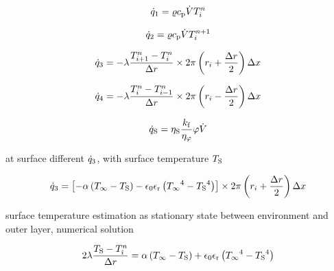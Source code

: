 \documentclass{scrartcl}
\begin{document}
    \begin{equation}
        {\dot{q}}_1 = {\varrho} {c_\mathrm{p}} {\dot{V}} {T}_{{i}}^{{n}}
        \label{eq:heat_flow_1}
    \end{equation}

    \begin{equation}
        {\dot{q}}_2 = {\varrho} {c_\mathrm{p}} {\dot{V}} {T}_{{i}}^{{n}+1}
        \label{eq:heat_flow_2}
    \end{equation}

    \begin{equation}
        {\dot{q}}_3 = -{\lambda} \frac{{T}_{{i}+1}^{{n}}-{T}_{{i}}^{{n}}}{{\Delta r}} \times 2 \pi \left( {r}_{i} + \frac{{\Delta r}}{2} \right) {\Delta x}
        \label{eq:heat_flow_3}
    \end{equation}

    \begin{equation}
        {\dot{q}}_4 = -{\lambda} \frac{{T}_{{i}}^{{n}}-{T}_{{i}-1}^{{n}}}{{\Delta r}} \times 2 \pi \left( {r}_{i} - \frac{{\Delta r}}{2} \right) {\Delta x}
        \label{eq:heat_flow_4}
    \end{equation}

    \begin{equation}
        {\dot{q}_\mathrm{S}} = {\eta_\mathrm{S}} \frac{{k_\mathrm{f}}}{{\eta_\varphi}} {\varphi} {\dot{V}}
        \label{eq:heat_source}
    \end{equation}

    at surface different ${\dot{q}}_3$, with surface temperature ${T_\mathrm{S}}$

    \begin{equation}
        {\dot{q}}_3 = \left[ -{\alpha} \left( {T_\infty} - {T_\mathrm{S}} \right) - {\epsilon_0}{\epsilon_\mathrm{r}}\left( {T_\infty}^4 - {T_\mathrm{S}}^4 \right) \right]
        \times 2 \pi \left( {r}_{i} + \frac{{\Delta r}}{2} \right) {\Delta x}
        \label{eq:heat_flow_3_surface}
    \end{equation}

    surface temperature estimation as stationary state between environment and outer layer, numerical solution

    \begin{equation}
        2 {\lambda} \frac{{T_\mathrm{S}} - {T}_{\hat{\imath}}^{n}}{{\Delta r}} = {\alpha} \left( {T_\infty} - {T_\mathrm{S}} \right) + {\epsilon_0}{\epsilon_\mathrm{r}}\left( {T_\infty}^4 - {T_\mathrm{S}}^4 \right)
        \label{eq:surface_temperature}
    \end{equation}
\end{document}

